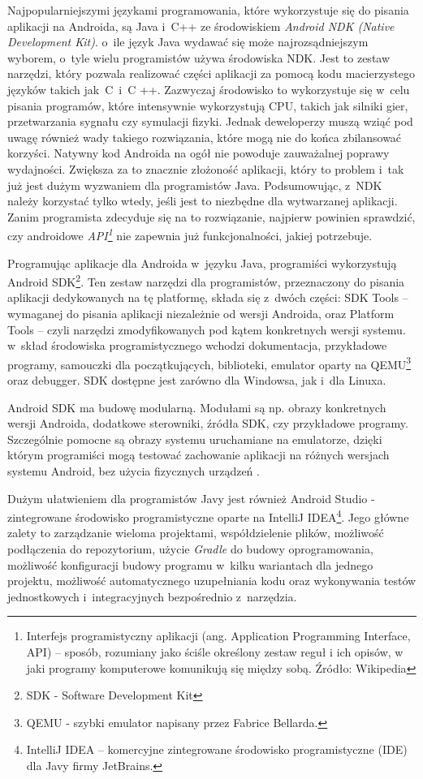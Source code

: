 Najpopularniejszymi językami programowania, które wykorzystuje się do pisania aplikacji na Androida, są Java i~C++ ze środowiskiem \textit{Android NDK (Native Development Kit)}. o~ile język Java wydawać się może najrozsądniejszym wyborem, o~tyle wielu programistów używa środowiska NDK. Jest to zestaw narzędzi, który pozwala realizować części aplikacji za pomocą kodu macierzystego języków takich jak~C~i~C ++. Zazwyczaj środowisko to wykorzystuje się w~celu pisania programów, które intensywnie wykorzystują CPU, takich jak silniki gier, przetwarzania sygnału czy symulacji fizyki. Jednak deweloperzy muszą wziąć pod uwagę również wady takiego rozwiązania, które mogą nie do końca zbilansować korzyści. Natywny kod Androida na ogół nie powoduje zauważalnej poprawy wydajności. Zwiększa za to znacznie złożoność aplikacji, który to problem i~tak już jest dużym wyzwaniem dla programistów Java. Podsumowując, z~NDK należy korzystać tylko wtedy, jeśli jest to niezbędne dla wytwarzanej aplikacji. Zanim programista zdecyduje się na to rozwiązanie, najpierw powinien sprawdzić, czy androidowe \textit{API\footnote{Interfejs programistyczny aplikacji (ang. Application Programming Interface, API) – sposób, rozumiany jako ściśle określony zestaw reguł i ich opisów, w jaki programy komputerowe komunikują się między sobą. Źródło: Wikipedia}} nie zapewnia już funkcjonalności, jakiej potrzebuje.

Programując aplikacje dla Androida w~języku Java, programiści wykorzystują Android SDK\footnote{SDK - Software Development Kit}. Ten zestaw narzędzi dla programistów, przeznaczony do pisania aplikacji dedykowanych na tę platformę, składa się z~dwóch części: SDK Tools – wymaganej do pisania aplikacji niezależnie od wersji Androida, oraz Platform Tools – czyli narzędzi zmodyfikowanych pod kątem konkretnych wersji systemu. w~skład środowiska programistycznego wchodzi dokumentacja, przykładowe programy, samouczki dla początkujących, biblioteki, emulator oparty na QEMU\footnote{QEMU - szybki emulator napisany przez Fabrice Bellarda.} oraz debugger. SDK dostępne jest zarówno dla Windowsa, jak i~dla Linuxa.

Android SDK ma budowę modularną. Modułami są np. obrazy konkretnych wersji Androida, dodatkowe sterowniki, źródła SDK, czy przykładowe programy. Szczególnie pomocne są obrazy systemu uruchamiane na emulatorze, dzięki którym programiści mogą  testować zachowanie aplikacji na różnych wersjach systemu Android, bez użycia fizycznych urządzeń \cite{website:android:sdk}.

Dużym ułatwieniem dla programistów Javy jest również Android Studio - zintegrowane środowisko programistyczne oparte na IntelliJ IDEA\footnote{IntelliJ IDEA – komercyjne zintegrowane środowisko programistyczne (IDE) dla Javy firmy JetBrains.}. Jego główne zalety to zarządzanie wieloma projektami, współdzielenie plików, możliwość podłączenia do repozytorium, użycie \textit{Gradle} do budowy oprogramowania, możliwość konfiguracji budowy programu w~kilku wariantach dla jednego projektu, możliwość automatycznego uzupełniania kodu oraz wykonywania testów jednostkowych i~integracyjnych bezpośrednio z~narzędzia.

